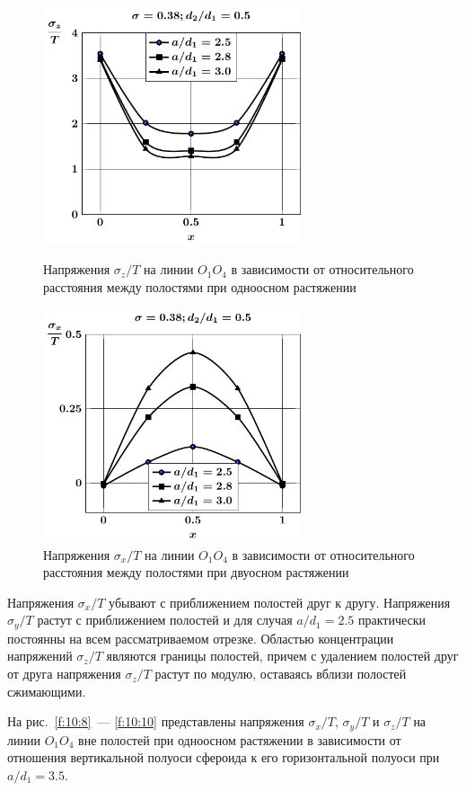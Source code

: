 \begin{figure}[h!]
\centering\footnotesize
\parbox[b]{7.5cm}{\centering\includegraphics[width=7.6cm]{cav4-oblate-a-d50-t1-sig_z.pdf}
\caption{Напряжения $\sigma_z/T$ на линии $O_1O_4$ в зависимости от относительного расстояния между полостями при одноосном растяжении
\label{f:10:4}}}\hfil\hfil
\parbox[b]{7.5cm}{\centering\includegraphics[width=7.6cm]{cav4-oblate-a-d50-t2-sig_x.pdf}
\caption{Напряжения $\sigma_x/T$ на линии $O_1O_4$ в зависимости от относительного расстояния между полостями при двуосном растяжении
\label{f:10:5}}}
\end{figure}

Напряжения $\sigma_x/T$ убывают с приближением полостей друг к другу. Напряжения $\sigma_y/T$ растут с приближением полостей и для случая $a/d_1=2.5$ практически постоянны на всем рассматриваемом отрезке. Областью концентрации напряжений $\sigma_z/T$ являются границы полостей, причем с удалением полостей друг от друга напряжения $\sigma_z/T$ растут по модулю, оставаясь вблизи полостей сжимающими.

На рис.~\ref{f:10:8}~--- \ref{f:10:10} представлены напряжения $\sigma_x/T$, $\sigma_y/T$ и $\sigma_z/T$ на линии $O_1O_4$ вне полостей при одноосном растяжении в зависимости от отношения вертикальной полуоси сфероида к его горизонтальной полуоси при $a/d_1=3.5$.

